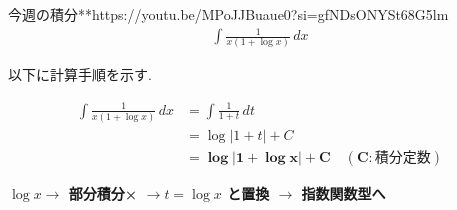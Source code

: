 \documentclass[main]{subfiles}
\begin{document}

\begin{mondai}{11}{今週の積分}{**}{https://youtu.be/MPoJJBuaue0?si=gfNDsONYSt68G5lm}
    \begin{align*}
        \int \frac{1}{x(1+\log x)} \, dx
    \end{align*}
\end{mondai}


\solutionhead
\hfill
以下に計算手順を示す.
\hfill\


\begin{align*}
\int \frac{1}{x(1+\log x)} \, dx &= \int \frac{1}{1+t} \, dt \\
&= \log|1+t| + C \\
&= \boldsymbol{
    \log|1+\log x| + C \quad (C:\textbf{積分定数})}
\end{align*}

\begin{focusbox}
\centering
\textbf{$\log x \rightarrow$ 部分積分×
$\rightarrow t = \log x$ と置換
$\rightarrow$ 指数関数型へ}
\end{focusbox}
\end{document}
